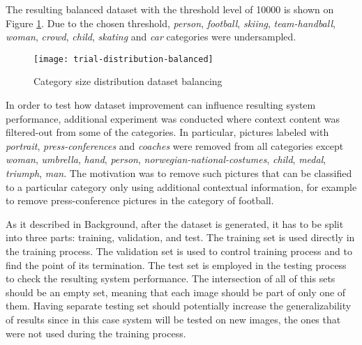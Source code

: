    The resulting balanced dataset with the threshold level of 10000 is shown on Figure \ref{fig:trial-distribution-balanced}. Due to the chosen threshold, \textit{person}, \textit{football}, \textit{skiing}, \textit{team-handball}, \textit{woman}, \textit{crowd}, \textit{child}, \textit{skating} and \textit{car} categories were undersampled.
    
    \begin{figure}[H]
        \centering
        \texttt{[image: trial-distribution-balanced]}
        \caption[Trial experiment. Category size distribution dataset balancing]{Category size distribution dataset balancing}
        \label{fig:trial-distribution-balanced}
    \end{figure}
    
    In order to test how dataset improvement can influence resulting system performance, additional experiment was conducted where context content was filtered-out from some of the categories. In particular, pictures labeled with \textit{portrait}, \textit{press-conferences} and \textit{coaches} were removed from all categories except \textit{woman}, \textit{umbrella}, \textit{hand}, \textit{person}, \textit{norwegian-national-costumes}, \textit{child}, \textit{medal}, \textit{triumph}, \textit{man}. The motivation was to remove such pictures that can be classified to a particular category only using additional contextual information, for example to remove press-conference pictures in the category of football.
    
    As it described in Background, after the dataset is generated, it has to be split into three parts: training, validation, and test. The training set is used directly in the training process. The validation set is used to control training process and to find the point of its termination. The test set is employed in the testing process to check the resulting system performance. The intersection of all of this sets should be an empty set, meaning that each image should be part of only one of them. Having separate testing set should potentially increase the generalizability of results since in this case system will be tested on new images, the ones that were not used during the training process. 
    

